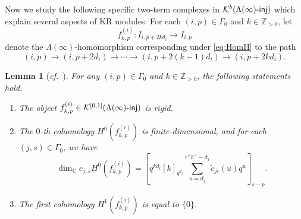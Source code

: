 \documentclass[12pt]{amsart}
\newtheorem{lemma}[theorem]{Lemma}
\theoremstyle{definition}
\theoremstyle{remark}
\numberwithin{equation}{section}
\newcommand{\confer}{\textit{cf.}\ }
\newcommand{\injc}{\mathchar`-\mathsf{inj}}
\begin{document}
Now we study the following specific two-term complexes in $\mathcal{K}^b(\Lambda(\infty)\injc)$ which explain several aspects of KR modules:
For each $(i,p) \in \Gamma_0$ and $k \in \mathbb{Z}_{>0}$, let 
\[f^{(i)}_{k,p} \colon I_{i,p+2kd_i} \to I_{i,p}
\] denote the $\Lambda(\infty)$-homomorphism corresponding under \eqref{eq:HomII} to the path
\begin{equation} \label{eq:ep^k}
 (i,p) \to (i, p+2d_i) \to \cdots \to (i,p+2(k-1)d_i)\to (i,p+2kd_i).
\end{equation}
\begin{lemma}[{\confer \cite[\S5]{FM}}] \label{lem:KKR}
For any $(i,p) \in \Gamma_0$ and $k \in \mathbb{Z}_{>0}$, the following statements hold.
\begin{enumerate}
\item[(i)] \label{eq:KKR1} The object $f^{(i)}_{k,p} \in \mathcal{K}^{[0,1]}(\Lambda(\infty)\injc)$ is \emph{rigid}.
\item[(ii)] \label{eeq:KKR2}
The $0$-th cohomology $H^0(f^{(i)}_{k,p})$ is finite-dimensional, and for each $(j,s) \in \Gamma_0$, we have
\[ \dim_{\mathbb{C}} e_{j,s}H^0(f^{(i)}_{k,p}) = \left[ q^{kd_i} [k]_{q^{d_i}} \sum_{u=d_j}^{r^\vee h^\vee -d_j} \widetilde{c}_{ji}(u)q^u\right]_{s-p}. \]
\item[(iii)] \label{eq:KKR3} The first cohomology $H^1(f^{(i)}_{k,p})$ is equal to $\{0\}$.
\end{enumerate}
\end{lemma}
\end{document}

